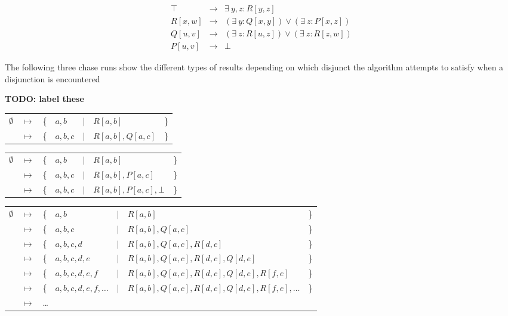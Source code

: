 		\begin{eqnarray}
			\top    &  \to  &  \exists\ y,z : R[y,z]                             \\
			R[x,w]  &  \to  &  (\exists\ y : Q[x,y]) \vee (\exists\ z : P[x,z])  \\
			Q[u,v]  &  \to  &  (\exists\ z : R[u,z]) \vee (\exists\ z : R[z,w])  \\
			P[u,v]  &  \to  &  \bot
		\end{eqnarray}

		The following three chase runs show the different types of results
		depending on which disjunct the algorithm attempts to satisfy when a
		disjunction is encountered

		\textbf{TODO: label these}

		\begin{tabular}{lllllll}
			$\emptyset$ & $\mapsto$ & \{ & $a,b$   & $|$ & $R[a,b]$         & \} \\
			{}          & $\mapsto$ & \{ & $a,b,c$ & $|$ & $R[a,b], Q[a,c]$ & \} \\
		\end{tabular}

		\begin{tabular}{lllllll}
			$\emptyset$ & $\mapsto$ & \{ & $a,b$   & $|$ & $R[a,b]$               & \} \\
			{}          & $\mapsto$ & \{ & $a,b,c$ & $|$ & $R[a,b], P[a,c]$       & \} \\
			{}          & $\mapsto$ & \{ & $a,b,c$ & $|$ & $R[a,b], P[a,c], \bot$ & \} \\
		\end{tabular}

		\begin{tabular}{lllllll}
			$\emptyset$ & $\mapsto$ & \{ & $a,b$                & $|$ & $R[a,b]$                                        & \} \\
			{}          & $\mapsto$ & \{ & $a,b,c$              & $|$ & $R[a,b], Q[a,c]$                                & \} \\
			{}          & $\mapsto$ & \{ & $a,b,c,d$            & $|$ & $R[a,b], Q[a,c], R[d,c]$                        & \} \\
			{}          & $\mapsto$ & \{ & $a,b,c,d,e$          & $|$ & $R[a,b], Q[a,c], R[d,c], Q[d,e]$                & \} \\
			{}          & $\mapsto$ & \{ & $a,b,c,d,e,f$        & $|$ & $R[a,b], Q[a,c], R[d,c], Q[d,e], R[f,e]$        & \} \\
			{}          & $\mapsto$ & \{ & $a,b,c,d,e,f,\ldots$ & $|$ & $R[a,b], Q[a,c], R[d,c], Q[d,e], R[f,e],\ldots$ & \} \\
			{}          & $\mapsto$ & \multicolumn{5}{l}{ \ldots } \\
		\end{tabular}
